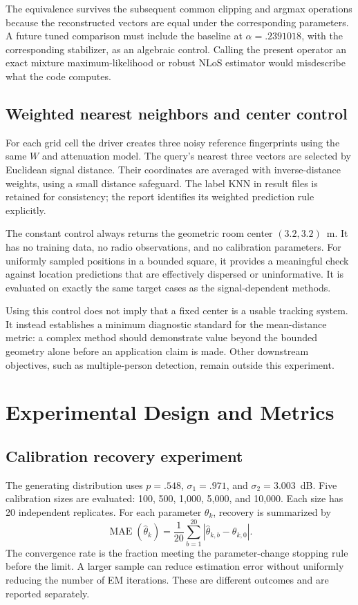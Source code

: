 \documentclass[conference,letterpaper]{IEEEtran}
\begin{document}
The equivalence survives the subsequent common clipping and argmax operations because the reconstructed vectors are equal under the corresponding parameters. A future tuned comparison must include the baseline at $\alpha=.2391018$, with the corresponding stabilizer, as an algebraic control. Calling the present operator an exact mixture maximum-likelihood or robust NLoS estimator would misdescribe what the code computes.

\subsection{Weighted nearest neighbors and center control}
For each grid cell the driver creates three noisy reference fingerprints using the same $W$ and attenuation model. The query's nearest three vectors are selected by Euclidean signal distance. Their coordinates are averaged with inverse-distance weights, using a small distance safeguard. The label KNN in result files is retained for consistency; the report identifies its weighted prediction rule explicitly.

The constant control always returns the geometric room center $(3.2,3.2)$~m. It has no training data, no radio observations, and no calibration parameters. For uniformly sampled positions in a bounded square, it provides a meaningful check against location predictions that are effectively dispersed or uninformative. It is evaluated on exactly the same target cases as the signal-dependent methods.

Using this control does not imply that a fixed center is a usable tracking system. It instead establishes a minimum diagnostic standard for the mean-distance metric: a complex method should demonstrate value beyond the bounded geometry alone before an application claim is made. Other downstream objectives, such as multiple-person detection, remain outside this experiment.

\section{Experimental Design and Metrics}
\subsection{Calibration recovery experiment}
The generating distribution uses $p=.548$, $\sigma_1=.971$, and $\sigma_2=3.003$~dB. Five calibration sizes are evaluated: 100, 500, 1,000, 5,000, and 10,000. Each size has 20 independent replicates. For each parameter $\theta_k$, recovery is summarized by
\begin{equation}
\operatorname{MAE}(\widehat\theta_k)=\frac{1}{20}\sum_{b=1}^{20}
|\widehat\theta_{k,b}-\theta_{k,0}|.
\end{equation}
The convergence rate is the fraction meeting the parameter-change stopping rule before the limit. A larger sample can reduce estimation error without uniformly reducing the number of EM iterations. These are different outcomes and are reported separately.
\end{document}
